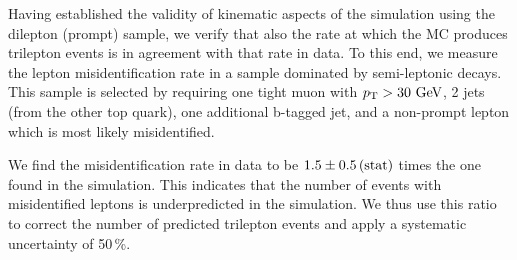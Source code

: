 Having established the validity of kinematic aspects of the \ttbar simulation using the dilepton (prompt) sample, we verify that also the rate at which the \ttbar MC produces trilepton events is in agreement with that rate in data. To this end, we measure the lepton misidentification rate in a sample dominated by semi-leptonic \ttbar decays. This sample is selected by requiring one tight muon with $p_{\mathrm{T}} > 30\,\,\text{Ge\hspace{-.08em}V}$, 2 jets (from the other top quark), one additional b-tagged jet, and a non-prompt lepton which is most likely misidentified.

We find the \ttbar misidentification rate in data to be $1.5 \pm 0.5\,\text{(stat)}$ times the one found in the \ttbar simulation. This indicates that the number of events with misidentified leptons is underpredicted in the \ttbar simulation. We thus use this ratio to correct the number of predicted trilepton events and apply a systematic uncertainty of 50\,\%.
